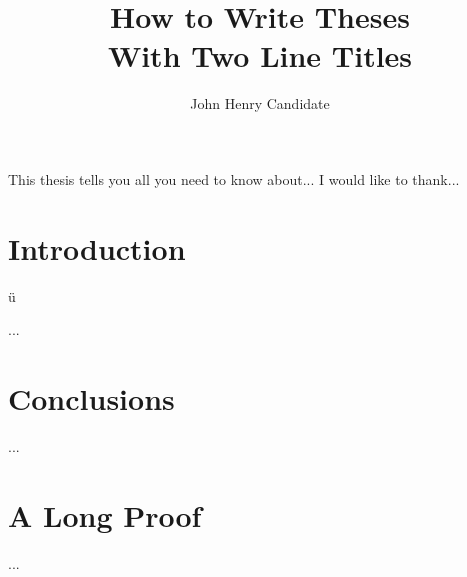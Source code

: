\documentclass{report}
\begin{document}
\title{How to Write Theses\\
            With Two Line Titles}
\author{John Henry Candidate}
 
\beforepreface
{}
This thesis tells you all you need to know about...
I would like to thank...
\afterpreface

\chapter{Introduction}

ü

\parencite{himmelmann1998documentary}
...
\chapter{Conclusions}
...
\appendix
\chapter{A Long Proof}
...

\printbibliography
\end{document}
